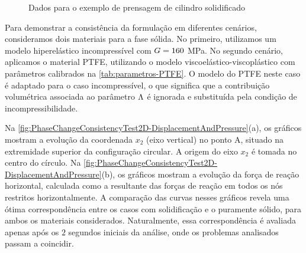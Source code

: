 \documentclass[Tese.tex]{subfiles}
\begin{document}
\begin{figure}[!htb]
	\centering
	\caption{Dados para o exemplo de prensagem de cilindro solidificado}
	\label{fig:PhaseChangeConsistencyTest2D}
	{\small
		\noindent{}
	}	
\end{figure}
\vspace{-0.2cm}
Para demonstrar a consistência da formulação em diferentes cenários, consideramos dois materiais para a fase sólida. No primeiro, utilizamos um modelo hiperelástico incompressível com $G = 160$ MPa. No segundo cenário, aplicamos o material PTFE, utilizando o modelo viscoelástico-viscoplástico com parâmetros calibrados na \cref{tab:parametros-PTFE}. O modelo do PTFE neste caso é adaptado para o caso incompressível, o que significa que a contribuição volumétrica associada ao parâmetro 
$\Lambda$ é ignorada e substituída pela condição de incompressibilidade.

Na \cref{fig:PhaseChangeConsistencyTest2D-DisplacementAndPressure}(a), os gráficos mostram a evolução da coordenada $x_2$ (eixo vertical) no ponto A, situado na extremidade superior da configuração circular. A origem do eixo $x_2$ é tomada no centro do círculo. Na \cref{fig:PhaseChangeConsistencyTest2D-DisplacementAndPressure}(b), os gráficos mostram a evolução da força de reação horizontal, calculada como a resultante das forças de reação em todos os nós restritos horizontalmente. A comparação das curvas nesses gráficos revela uma ótima correspondência entre os casos com solidificação e o puramente sólido, para ambos os materiais considerados. Naturalmente, essa correspondência é avaliada apenas após os $2$ segundos iniciais da análise, onde os problemas analisados passam a coincidir.
\end{document}
